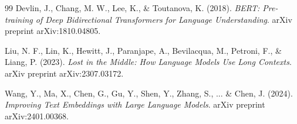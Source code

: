 \documentclass[../DoAn.tex]{subfiles}
\begin{document}
\begin{thebibliography}{99}
Devlin, J., Chang, M. W., Lee, K., \& Toutanova, K. (2018). 
\textit{BERT: Pre-training of Deep Bidirectional Transformers for Language Understanding}. 
arXiv preprint arXiv:1810.04805.

Liu, N. F., Lin, K., Hewitt, J., Paranjape, A., Bevilacqua, M., Petroni, F., \& Liang, P. (2023). 
\textit{Lost in the Middle: How Language Models Use Long Contexts}. 
arXiv preprint arXiv:2307.03172.

Wang, Y., Ma, X., Chen, G., Gu, Y., Shen, Y., Zhang, S., ... \& Chen, J. (2024). 
\textit{Improving Text Embeddings with Large Language Models}. 
arXiv preprint arXiv:2401.00368.

\end{thebibliography}
\end{document}
